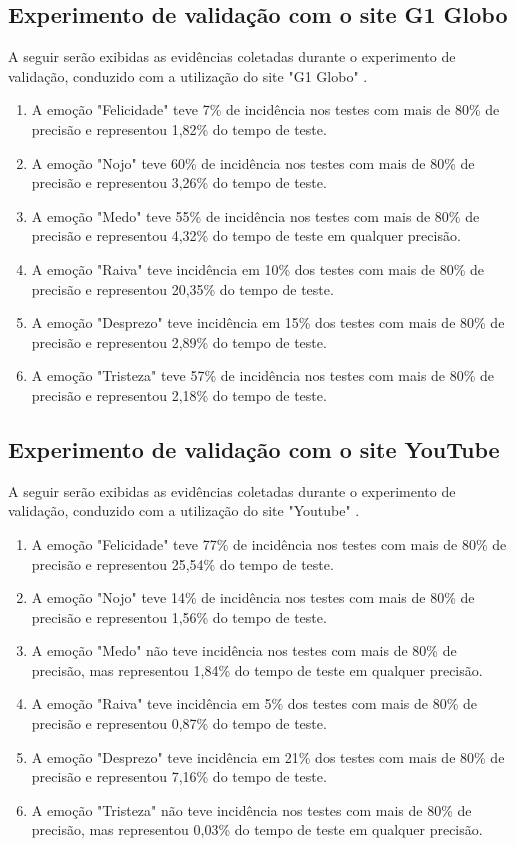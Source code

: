 \subsection{Experimento de validação com o site G1 Globo}

A seguir serão exibidas as evidências coletadas durante o experimento de validação, conduzido com a utilização do site "G1 Globo" \cite{19}.

\begin{enumerate}
  \item A emoção "Felicidade" teve 7\% de incidência nos testes com mais de 80\% de precisão e representou 1,82\% do tempo de teste.
  \item A emoção "Nojo" teve 60\% de incidência nos testes com mais de 80\% de precisão e representou 3,26\% do tempo de teste.
  \item A emoção "Medo" teve 55\% de incidência nos testes com mais de 80\% de precisão e representou 4,32\% do tempo de teste em qualquer precisão.
  \item A emoção "Raiva" teve incidência em 10\% dos testes com mais de 80\% de precisão e representou 20,35\% do tempo de teste.
  \item A emoção "Desprezo" teve incidência em 15\% dos testes com mais de 80\% de precisão e representou 2,89\% do tempo de teste.
  \item A emoção "Tristeza" teve 57\% de incidência nos testes com mais de 80\% de precisão e representou 2,18\% do tempo de teste.
\end{enumerate}

\subsection{Experimento de validação com o site YouTube}

A seguir serão exibidas as evidências coletadas durante o experimento de validação, conduzido com a utilização do site "Youtube" \cite{20}.

\begin{enumerate}
  \item A emoção "Felicidade" teve 77\% de incidência nos testes com mais de 80\% de precisão e representou 25,54\% do tempo de teste.
  \item A emoção "Nojo" teve 14\% de incidência nos testes com mais de 80\% de precisão e representou 1,56\% do tempo de teste.
  \item A emoção "Medo" não teve incidência nos testes com mais de 80\% de precisão, mas representou 1,84\% do tempo de teste em qualquer precisão.
  \item A emoção "Raiva" teve incidência em 5\% dos testes com mais de 80\% de precisão e representou 0,87\% do tempo de teste.
  \item A emoção "Desprezo" teve incidência em 21\% dos testes com mais de 80\% de precisão e representou 7,16\% do tempo de teste.
  \item A emoção "Tristeza" não teve incidência nos testes com mais de 80\% de precisão, mas representou 0,03\% do tempo de teste em qualquer precisão.
\end{enumerate}

